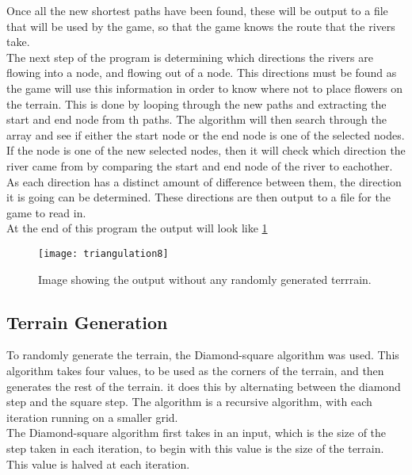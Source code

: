 
	Once all the new shortest paths have been found, these will be output to a file that will be used by the game, so that the game knows the route that the rivers take.\\
	The next step of the program is determining which directions the rivers are flowing into a node, and flowing out of a node. This directions must be found as the game will use this information in order to know where not to place flowers on the terrain. This is done by looping through the new paths and extracting the start and end node from th paths. The algorithm will then search through the array and see if either the start node or the end node is one of the selected nodes. If the node is one of the new selected nodes, then it will check which direction the river came from by comparing the start and end node of the river to eachother. As each direction has a distinct amount of difference between them, the direction it is going can be determined. These directions are then output to a file for the game to read in.\\


	At the end of this program the output will look like \ref{fig:triangulation8}

\begin{figure}[H]
	\texttt{[image: triangulation8]}
	\centering
	\caption{Image showing the output without any randomly generated terrrain.}
	\label{fig:triangulation8}
\end{figure}


\subsection{Terrain Generation}
	To randomly generate the terrain, the Diamond-square algorithm was used. This algorithm takes four values, to be used as the corners of the terrain, and then generates the rest of the terrain. it does this by alternating between the diamond step and the square step. The algorithm is a recursive algorithm, with each iteration running on a smaller grid.\\
	The Diamond-square algorithm first takes in an input, which is the size of the step taken in each iteration, to begin with this value is the size of the terrain. This value is halved at each iteration.\\


